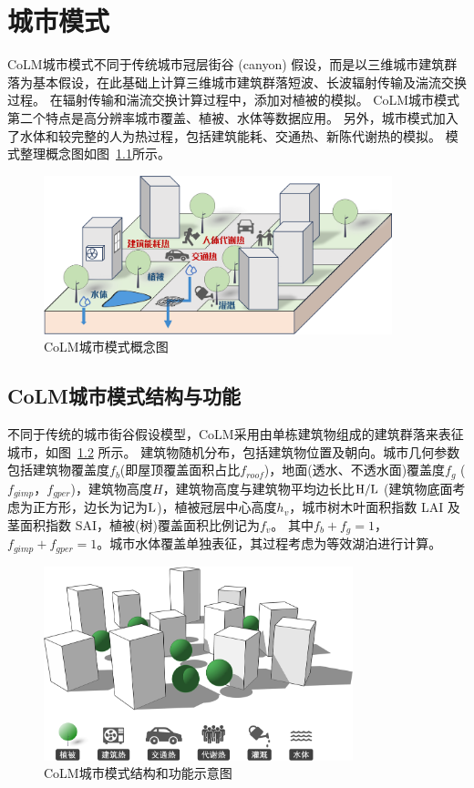 \chapter{城市模式}\label{城市模式}
CoLM城市模式不同于传统城市冠层街谷 (canyon) 假设，而是以三维城市建筑群落为基本假设，在此基础上计算三维城市建筑群落短波、长波辐射传输及湍流交换过程。
在辐射传输和湍流交换计算过程中，添加对植被的模拟。
CoLM城市模式第二个特点是高分辨率城市覆盖、植被、水体等数据应用。
另外，城市模式加入了水体和较完整的人为热过程，包括建筑能耗、交通热、新陈代谢热的模拟。
模式整理概念图如图~\ref{fig:CoLM城市模式概念图}所示。

{
\begin{figure}[htbp]
\centering
\includegraphics[width=0.9\textwidth]{Figures/城市模式/CoLM城市模式概念图.png}
\caption{CoLM城市模式概念图}
\label{fig:CoLM城市模式概念图}
\end{figure}
}

\section{CoLM城市模式结构与功能}
不同于传统的城市街谷假设模型，CoLM采用由单栋建筑物组成的建筑群落来表征城市，如图~\ref{fig:CoLM城市模式结构和功能示意图} 所示。
建筑物随机分布，包括建筑物位置及朝向。城市几何参数包括建筑物覆盖度$f_b$(即屋顶覆盖面积占比$f_{roof}$)，地面(透水、不透水面)覆盖度$f_g$ ($f_{gimp}$，$f_{gper}$)，建筑物高度$H$，建筑物高度与建筑物平均边长比$\rm H/L$ (建筑物底面考虑为正方形，边长为记为$\rm L$)，植被冠层中心高度$h_v$，城市树木叶面积指数 LAI 及茎面积指数 SAI，植被(树)覆盖面积比例记为$f_v$。
其中$f_b+f_g=1$，$f_{gimp}+f_{gper}=1$。城市水体覆盖单独表征，其过程考虑为等效湖泊进行计算。

{
\begin{figure}[htbp]
\centering
\includegraphics[width=0.8\textwidth]{Figures/城市模式/CoLM城市模式结构和功能示意图.png}
\caption{CoLM城市模式结构和功能示意图}
\label{fig:CoLM城市模式结构和功能示意图}
\end{figure}
}

